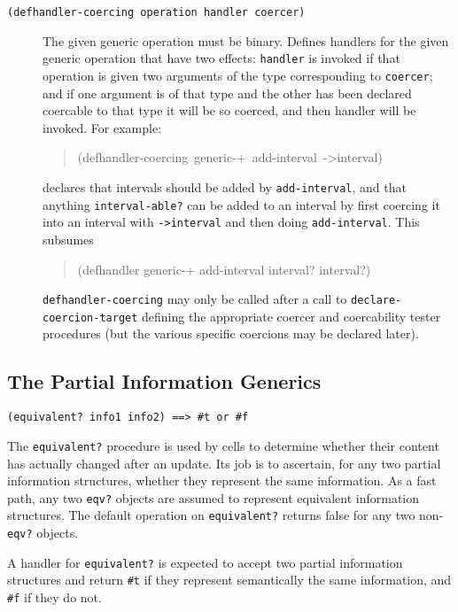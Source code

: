 \documentclass[12pt,letterpaper,english]{article}
\begin{document}
\begin{description}
\item[{\texttt{(defhandler-coercing operation handler coercer)}}] \leavevmode 
The given generic operation must be binary.  Defines handlers for
the given generic operation that have two effects: \texttt{handler} is
invoked if that operation is given two arguments of the type
corresponding to \texttt{coercer}; and if one argument is of that type
and the other has been declared coercable to that type it will be so
coerced, and then handler will be invoked.  For example:
\begin{quote}{\ttfamily \raggedright \noindent
(defhandler-coercing~generic-+~add-interval~->interval)
}\end{quote}
declares that intervals should be added by \texttt{add-interval}, and
that anything \texttt{interval-able?} can be added to an interval by
first coercing it into an interval with \texttt{->interval} and then
doing \texttt{add-interval}.  This subsumes
\begin{quote}{\ttfamily \raggedright \noindent
(defhandler generic-+ add-interval interval? interval?)
}\end{quote}

\texttt{defhandler-coercing} may only be called after a call to
\texttt{declare-coercion-target} defining the appropriate coercer and
coercability tester procedures (but the various specific coercions
may be declared later).

\end{description}



\subsection{The Partial Information Generics}
\label{the-partial-information-generics}

\texttt{(equivalent? info1 info2)  ==>  {\#}t or {\#}f}

The \texttt{equivalent?} procedure is used by cells to determine whether
their content has actually changed after an update.  Its job is to
ascertain, for any two partial information structures, whether they
represent the same information.  As a fast path, any two \texttt{eqv?}
objects are assumed to represent equivalent information structures.
The default operation on \texttt{equivalent?} returns false for any two
non-\texttt{eqv?} objects.

A handler for \texttt{equivalent?} is expected to accept two partial
information structures and return \texttt{{\#}t} if they represent
semantically the same information, and \texttt{{\#}f} if they do not.
\end{document}
